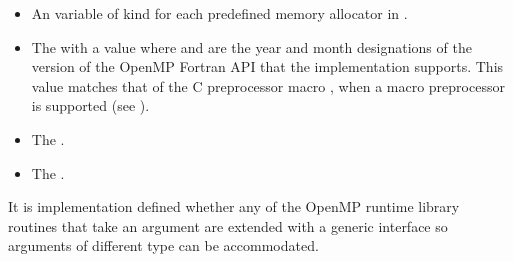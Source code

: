 \begin{fortranspecific}
\begin{itemize}
\item An   variable of kind  for each predefined memory allocator in .

\item The    with a value  where 
and  are the year and month designations of the version of the OpenMP Fortran
API that the implementation supports. This value matches that of the C preprocessor
macro , when a macro preprocessor is supported (see
).

\item The   .

\item The   .

\end{itemize}


It is implementation defined whether any of the OpenMP runtime library routines that
take an argument are extended with a generic interface so arguments of different 
type can be accommodated. 
\end{fortranspecific}







